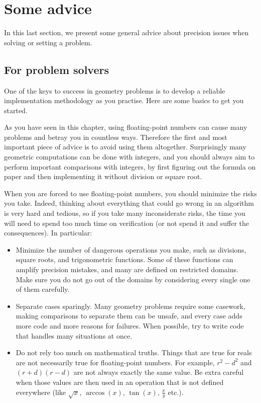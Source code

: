 \section{Some advice}
In this last section, we present some general advice about precision issues when solving or setting a problem.

\subsection{For problem solvers}
One of the keys to success in geometry problems is to develop a reliable implementation methodology as you practise. Here are some basics to get you started.

As you have seen in this chapter, using floating-point numbers can cause many problems and betray you in countless ways. Therefore the first and most important piece of advice is to avoid using them altogether. Surprisingly many geometric computations can be done with integers, and you should always aim to perform important comparisons with integers, by first figuring out the formula on paper and then implementing it without division or square root.

When you are forced to use floating-point numbers, you should minimize the risks you take. Indeed, thinking about everything that could go wrong in an algorithm is very hard and tedious, so if you take many inconsiderate risks, the time you will need to spend too much time on verification (or not spend it and suffer the consequences). In particular:
\begin{itemize}
\item Minimize the number of dangerous operations you make, such as divisions, square roots, and trigonometric functions. Some of these functions can amplify precision mistakes, and many are defined on restricted domains. Make sure you do not go out of the domains by considering every single one of them carefully.
\item Separate cases sparingly. Many geometry problems require some casework, making comparisons to separate them can be unsafe, and every case adds more code and more reasons for failures. When possible, try to write code that handles many situations at once.
\item Do not rely too much on mathematical truths. Things that are true for reals are not necessarily true for floating-point numbers. For example, $r^2-d^2$ and $(r+d)(r-d)$ are not always exactly the same value. Be extra careful when those values are then used in an operation that is not defined everywhere (like $\sqrt{x}$, $\arccos(x)$, $\tan(x)$, $\frac{x}{y}$ etc.).
\end{itemize}


